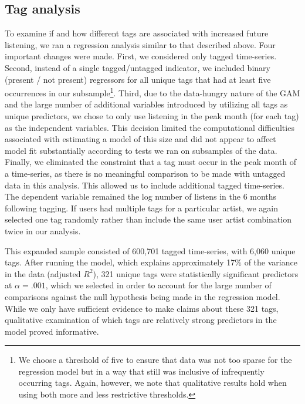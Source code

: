 \subsection{Tag analysis}
To examine if and how different tags are associated with increased future listening, we ran a regression analysis similar to that described above. Four important changes were made. First, we considered only tagged time-series.  Second, instead of a single tagged/untagged indicator, we included binary (present / not present) regressors for all unique tags that had at least five occurrences in our subsample\footnote{We choose a threshold of five to ensure that data was not too sparse for the regression model but in a way that still was inclusive of infrequently occurring tags.  Again, however, we note that qualitative results hold when using both more and less restrictive thresholds.}. Third, due to the data-hungry nature of the GAM and the large number of additional variables introduced by utilizing all tags as unique predictors, we chose to only use listening in the peak month (for each tag) as the independent variables. This decision limited the computational difficulties associated with estimating a model of this size and did not appear to affect model fit substantially according to tests we ran on subsamples of the data. Finally, we eliminated the constraint that a tag must occur in the peak month of a time-series, as there is no meaningful comparison to be made with untagged data in this analysis. This allowed us to include additional tagged time-series. The dependent variable remained the log number of listens in the 6 months following tagging. If users had multiple tags for a particular artist, we again selected one tag randomly rather than include the same user artist combination twice in our analysis.

This expanded sample consisted of 600,701 tagged time-series, with 6,060 unique tags. After running the model, which explains approximately 17\% of the variance in the data (adjusted $R^{2}$), 321 unique tags were statistically significant predictors at $\alpha =.001$, which we selected in order to account for the large number of comparisons against the null hypothesis being made in the regression model. While we only have sufficient evidence to make claims about these 321 tags, qualitative examination of which tags are relatively strong predictors in the model proved informative.

